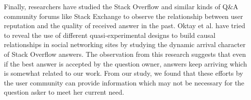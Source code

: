 Finally, researchers have studied the Stack Overflow and similar kinds of Q\&A community forums like Stack Exchange to observe the relationship between user reputation and the quality of received answer \cite{tausczik2011predicting} in the past. Oktay et al. have tried to reveal the use of different quasi-experimental designs to build causal relationships in social networking sites by studying the dynamic arrival \cite{oktay2010causal} character of Stack Overflow answers. The observation from this research suggests that even if the best answer is accepted by the question owner, answers keep arriving which is somewhat related to our work. From our study, we found that these efforts by the user community can provide information which may not be necessary for the question asker to meet her current need.